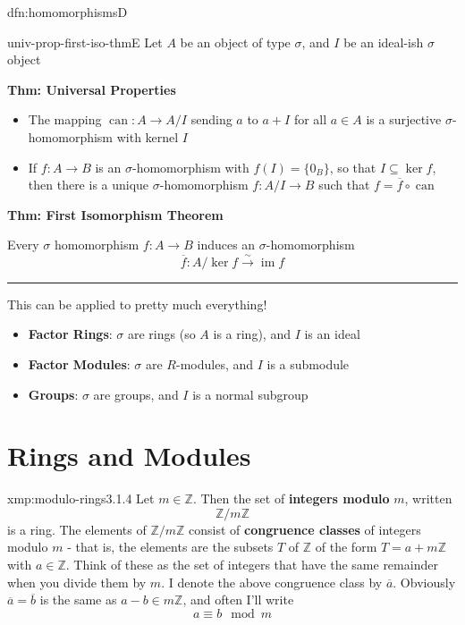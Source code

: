 \documentclass[landscape, 8pt]{extarticle}
\DeclareMathOperator{\im}{im}
\DeclareMathOperator{\can}{can}
\begin{document}
\begin{multicols}{3}
\begin{dfn}{dfn:homomorphisms}{D}
\end{dfn}

\begin{thm}{univ-prop-first-iso-thm}{E}
    Let $A$ be an object of type $\sigma$, and $I$ be an ideal-ish $\sigma$ object

    \textbf{Thm: Universal Properties}
    \begin{itemize}
        \item The mapping $\can : A \to A /I$ sending $a$ to $a + I$ for all $a\in A$ is a surjective $\sigma$-homomorphism with kernel $I$
        \item If $f : A \to B$ is an $\sigma$-homomorphism with $f(I) = \{0_{B}\}$, so that $I\subseteq \ker f$, then there is a unique $\sigma$-homomorphism $f : A / I \to B$ such that $f = \overline{f} \circ \can$
    \end{itemize}
    
    \textbf{Thm: First Isomorphism Theorem}

    Every $\sigma$ homomorphism $f : A \to B$ induces an $\sigma$-homomorphism
    \[\overline{f} : A / \ker f \xrightarrow{\sim} \im f\]

    \noindent\rule{\textwidth}{0.2pt}
    This can be applied to pretty much everything!
    \begin{itemize}[leftmargin=*]
        \setlength\itemsep{0em}
        \item \textbf{Factor Rings}: $\sigma$ are rings (so $A$ is a ring), and $I$ is an ideal
        \item \textbf{Factor Modules}: $\sigma$ are $R$-modules, and $I$ is a submodule
        \item \textbf{Groups}: $\sigma$ are groups, and $I$ is a normal subgroup
    \end{itemize}
\end{thm}

\section{Rings and Modules}

\begin{xmp}{xmp:modulo-rings}{3.1.4}
    Let $m\in \mathbb{Z}$. Then the set of \textbf{integers modulo} $m$, written
    \[\mathbb{Z} / m\mathbb{Z}\]
    is a ring. The elements of $\mathbb{Z} / m\mathbb{Z}$ consist of \textbf{congruence classes} of integers modulo $m$ - that is, the elements are the subsets $T$ of $\mathbb{Z}$ of the form $T = a + m\mathbb{Z}$ with $a\in \mathbb{Z}$. Think of these as the set of integers that have the same remainder when you divide them by $m$. I denote the above congruence class by $\overline{a}$. Obviously $\overline{a} = \overline{b}$ is the same as $a-b\in m\mathbb{Z}$, and often I'll write
    \[a \equiv b \mod m\]
\end{xmp}



\end{multicols}
\end{document}

